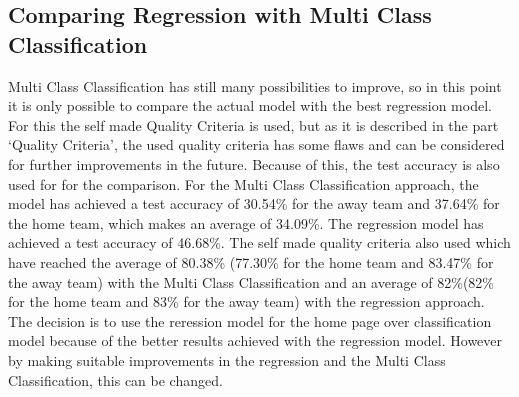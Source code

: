 \subsection{Comparing Regression with Multi Class Classification}
 Multi Class Classification has still many possibilities to improve, so in this point it is only possible to compare the actual model with the best regression model. For this the self made Quality Criteria is used, but as it is described in the part `Quality Criteria', the used quality criteria has some flaws and can be considered for further improvements in the future. Because of this, the test accuracy is also used for for the comparison. For the Multi Class Classification approach, the model has achieved a test accuracy of 30.54\% for the away team and 37.64\% for the home team, which makes an average of 34.09\%. The regression model has achieved a test accuracy of 46.68\%. The self made quality criteria also used which have reached the average of  80.38\% (77.30\% for the home team and 83.47\% for the away team) with the Multi Class Classification and an average of 82\%(82\% for the home team and 83\% for the away team) with the regression approach. The decision is to use the reression model for the home page over classification model because of the better results achieved with the regression model. However by making suitable improvements in the regression and the Multi Class Classification, this can be changed.